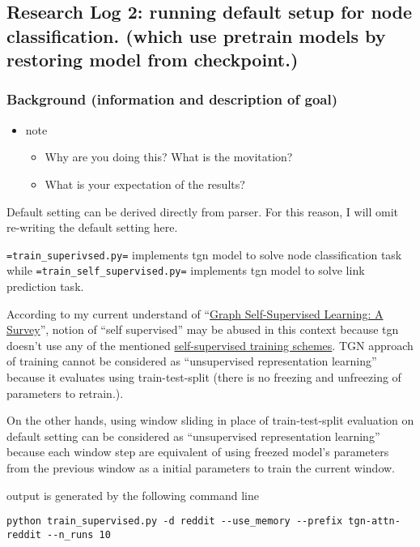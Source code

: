 \documentclass[11pt]{article}
\begin{document}
\subsection{Research Log 2: running default setup for node classification. (which use pretrain models by restoring model from checkpoint.)}
\label{sec:org5e1da9a}
\subsubsection{Background (information and description of goal)}
\label{sec:org74422d3}
\begin{itemize}
\item note
\begin{itemize}
\item Why are you doing this? What is the movitation?
\item What is your expectation of the results?
\end{itemize}
\end{itemize}

Default setting can be derived directly from parser. For this reason, I will omit re-writing the default setting here.

\texttt{=train\_superivsed.py=} implements tgn model to solve node classification task while \texttt{=train\_self\_supervised.py=} implements tgn model to solve link prediction task.

According to my current understand of ``\href{https://roamresearch.com/\#/app/AdaptiveGraphStucture/page/qIjLHRFKZ}{Graph Self-Supervised Learning: A Survey}'', notion of ``self supervised'' may be abused in this context because tgn doesn't use any of the mentioned \href{https://roamresearch.com/\#/app/AdaptiveGraphStucture/page/YdDoZ\_0LS}{self-supervised training schemes}. TGN approach of training cannot be considered as ``unsupervised representation learning'' because it evaluates using train-test-split (there is no freezing and unfreezing of parameters to retrain.).

On the other hands, using window sliding in place of train-test-split evaluation on default setting can be considered as ``unsupervised representation learning'' because each window step are equivalent of using freezed model's parameters from the previous window as a initial parameters to train the current window.

output is generated by the following command line
\begin{verbatim}
python train_supervised.py -d reddit --use_memory --prefix tgn-attn-reddit --n_runs 10
\end{verbatim}
\end{document}

